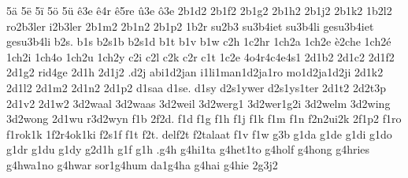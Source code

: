 {%
5ä
5ë
5ï
5ö
5ü
%
ê3e
ê4r
ê5re
û3e
ô3e
%
%
%
2b1d2
2b1f2
2b1g2
2b1h2
2b1j2
2b1k2
1b2l2
ro2b3ler
i2b3ler
2b1m2
2b1n2
2b1p2
1b2r
su2b3
su3b4iet
su3b4li
gesu3b4iet
gesu3b4li
b2s.
b1s
b2s1b
b2s1d
b1t
b1v
b1w
%
c2h
1c2hr
1ch2a
1ch2e
è2che
1ch2é
1ch2i
1ch4o
1ch2u
1ch2y
c2i
c2l
c2k
c2r
c1t
1c2e
4o4r4c4e4s1
%
2d1b2
2d1c2
2d1f2
2d1g2
rid4ge
2d1h
2d1j2
.d2j
abi1d2jan
i1li1man1d2ja1ro
mo1d2ja1d2ji
2d1k2
2d1l2
2d1m2
2d1n2
2d1p2
d1saa
d1se.
d1sy
d2s1ywer
d2s1ys1ter
2d1t2
2d2t3p
2d1v2
%
2d1w2
3d2waal
3d2waas
3d2weil
3d2werg1
3d2wer1g2i
3d2welm
3d2wing
3d2wong
2d1wu
r3d2wyn
%
f1b
2f2d.
f1d
f1g
f1h
f1j
f1k
f1m
f1n
f2n2ui2k
2f1p2
f1ro
f1rok1k
1f2r4ok1ki
f2s1f
f1t
f2t.
delf2t
f2talaat
f1v
f1w
%
%
g3b
g1da
g1de
g1di
g1do
g1dr
g1du
g1dy
g2d1h
g1f
%
g1h
.g4h
g4hi1ta
g4het1to
g4holf
g4hong
g4hries
g4hwa1no
g4hwar
sor1g4hum
da1g4ha
g4hai
g4hie
%
2g3j2
}
